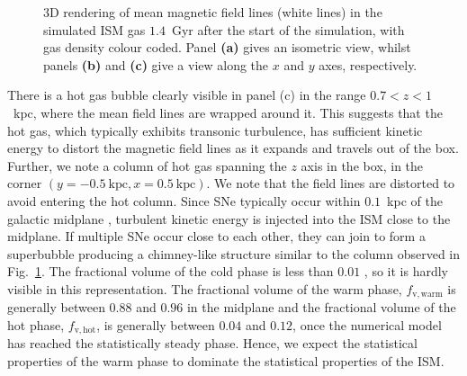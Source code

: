 \documentclass[useAMS,usenatbib]{mn2e}
\begin{document}
\begin{figure}
\caption{$3$D rendering of mean magnetic field lines (white lines) in the simulated ISM gas $1.4$~Gyr after the start of the simulation, with gas density colour coded. Panel \textbf{(a)} gives an isometric view, whilst panels \textbf{(b)} and \textbf{(c)} give a view along the $x$ and $y$ axes, respectively.}
\label{fig:vis_td}
\end{figure}
There is a hot gas bubble clearly visible in panel (c) in the range $0.7<z<1$~kpc, where the mean field lines are wrapped around it. This suggests that the hot gas, which typically exhibits transonic turbulence, has sufficient kinetic energy to distort the magnetic field lines as it expands and travels out of the box. Further, we note a column of hot gas spanning the $z$ axis in the box, in the corner $(y = -0.5~\mathrm{kpc},x = 0.5~\mathrm{kpc})$. We note that the field lines are distorted to avoid entering the hot column. Since SNe typically occur within $0.1$~kpc of the galactic midplane \citep{Gent12}, turbulent kinetic energy is injected into the ISM close to the midplane. If multiple SNe occur close to each other, they can join to form a superbubble producing a chimney-like structure \citep{Gent12} similar to the column observed in Fig.~\ref{fig:vis_td}. The fractional volume of the cold phase is less than $0.01$ \citep{Gent12}, so it is hardly visible in this representation. The fractional volume of the warm phase, $f_{\mathrm{v,warm}}$ is generally between $0.88$ and $0.96$ in the midplane and the fractional volume of the hot phase, $f_{\mathrm{v,hot}}$, is generally between $0.04$ and $0.12$, once the numerical model has reached the statistically steady phase. Hence, we expect the statistical properties of the warm phase to dominate the statistical properties of the ISM.
\end{document}
